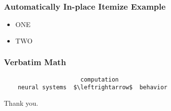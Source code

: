 \documentclass{beamer}
\begin{document}
\begin{frame}
  \frametitle{Automatically In-place Itemize Example}

  \begin{itemize}[<+-| only@+>]
  \item ONE
  \item TWO
  \end{itemize}
\end{frame}

\begin{frame}
  \frametitle{Verbatim Math}

  \begin{lstlisting}
                      computation
    neural systems  $\leftrightarrow$  behavior
  \end{lstlisting}
\end{frame}


\begin{frame}[label=thank_you]
  \vspace{-1.5in}
  \begin{mdframed}[style=description]
    {\large Thank you.}
  \end{mdframed}
\end{frame}
\end{document}
